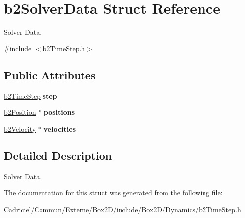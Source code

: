 \hypertarget{structb2_solver_data}{}\section{b2\+Solver\+Data Struct Reference}
\label{structb2_solver_data}


Solver Data.  




{\ttfamily \#include $<$b2\+Time\+Step.\+h$>$}

\subsection*{Public Attributes}
\begin{DoxyCompactItemize}
\item 
\hyperlink{structb2_time_step}{b2\+Time\+Step} {\bfseries step}\hypertarget{structb2_solver_data_a99998296de1b4f128c396def56392eea}{}\label{structb2_solver_data_a99998296de1b4f128c396def56392eea}

\item 
\hyperlink{structb2_position}{b2\+Position} $\ast$ {\bfseries positions}\hypertarget{structb2_solver_data_a5eb6ee68b42d96164579a4a0df8be04b}{}\label{structb2_solver_data_a5eb6ee68b42d96164579a4a0df8be04b}

\item 
\hyperlink{structb2_velocity}{b2\+Velocity} $\ast$ {\bfseries velocities}\hypertarget{structb2_solver_data_a1072627a3e962a8bc7088657a512191c}{}\label{structb2_solver_data_a1072627a3e962a8bc7088657a512191c}

\end{DoxyCompactItemize}


\subsection{Detailed Description}
Solver Data. 

The documentation for this struct was generated from the following file\+:\begin{DoxyCompactItemize}
\item 
Cadriciel/\+Commun/\+Externe/\+Box2\+D/include/\+Box2\+D/\+Dynamics/b2\+Time\+Step.\+h\end{DoxyCompactItemize}
